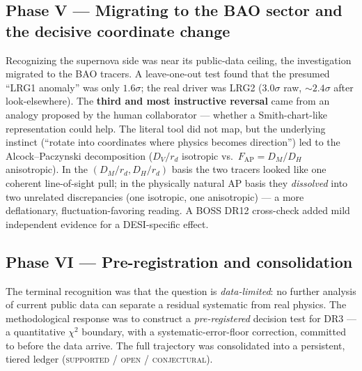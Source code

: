 \documentclass[11pt]{article}
\newcommand{\Dmrd}{\ensuremath{D_M/r_d}}
\newcommand{\Dhrd}{\ensuremath{D_H/r_d}}
\newcommand{\Dvrd}{\ensuremath{D_V/r_d}}
\newcommand{\FAP}{\ensuremath{F_{\mathrm{AP}}}}
\newcommand{\chisq}{\ensuremath{\chi^2}}
\begin{document}
\subsection{Phase V --- Migrating to the BAO sector and the decisive coordinate change}
Recognizing the supernova side was near its public-data ceiling, the investigation migrated to the BAO tracers. A leave-one-out test found that the presumed ``LRG1 anomaly'' was only $1.6\sigma$; the real driver was LRG2 ($3.0\sigma$ raw, $\sim\!2.4\sigma$ after look-elsewhere). The \textbf{third and most instructive reversal} came from an analogy proposed by the human collaborator --- whether a Smith-chart-like representation could help. The literal tool did not map, but the underlying instinct (``rotate into coordinates where physics becomes direction'') led to the Alcock--Paczynski decomposition ($\Dvrd$ isotropic vs.\ $\FAP=D_M/D_H$ anisotropic). In the $(\Dmrd,\Dhrd)$ basis the two tracers looked like one coherent line-of-sight pull; in the physically natural AP basis they \emph{dissolved} into two unrelated discrepancies (one isotropic, one anisotropic) --- a more deflationary, fluctuation-favoring reading. A BOSS DR12 cross-check added mild independent evidence for a DESI-specific effect.

\subsection{Phase VI --- Pre-registration and consolidation}
The terminal recognition was that the question is \emph{data-limited}: no further analysis of current public data can separate a residual systematic from real physics. The methodological response was to construct a \emph{pre-registered} decision test for DR3 --- a quantitative $\chisq$ boundary, with a systematic-error-floor correction, committed to before the data arrive. The full trajectory was consolidated into a persistent, tiered ledger (\textsc{supported} / \textsc{open} / \textsc{conjectural}).
\end{document}
